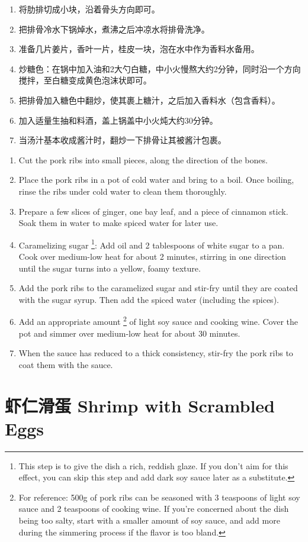 \documentclass{article}
\newcommand{\chn}[1]{\foreignlanguage{chinese-simplified}{#1}}
\begin{document}
\begin{paracol}{2}
    \begin{enumerate}
        \item \foreignlanguage{chinese-simplified}{将肋排切成小块，沿着骨头方向即可。}
        \item \chn{把排骨冷水下锅焯水，煮沸之后冲凉水将排骨洗净。}
        \item \chn{准备几片姜片，香叶一片，桂皮一块，泡在水中作为香料水备用。}
        \item \chn{炒糖色：在锅中加入油和2大勺白糖，中小火慢熬大约2分钟，同时沿一个方向搅拌，至白糖变成黄色泡沫状即可。}
        \item \chn{把排骨加入糖色中翻炒，使其裹上糖汁，之后加入香料水（包含香料）。}
        \item \chn{加入适量生抽和料酒，盖上锅盖中小火炖大约30分钟。}
        \item \chn{当汤汁基本收成酱汁时，翻炒一下排骨让其被酱汁包裹。}
    \end{enumerate}
    
    \switchcolumn
    \begin{enumerate}
        \item Cut the pork ribs into small pieces, along the direction of the bones.
        \item Place the pork ribs in a pot of cold water and bring to a boil. 
        Once boiling, rinse the ribs under cold water to clean them thoroughly.
        \item Prepare a few slices of ginger, one bay leaf, and a piece of cinnamon stick. 
        Soak them in water to make spiced water for later use.
        \item Caramelizing sugar \footnote{This step is to give the dish a rich, reddish glaze. If you don't aim for this effect, you can skip this step and add dark soy sauce later as a substitute.}: 
        Add oil and 2 tablespoons of white sugar to a pan. 
        Cook over medium-low heat for about 2 minutes, stirring in one direction until the sugar turns into a yellow, foamy texture.
        \item Add the pork ribs to the caramelized sugar and stir-fry until they are coated with the sugar syrup. 
        Then add the spiced water (including the spices).
        \item Add an appropriate amount
        \footnote{For reference: 500g of pork ribs can be seasoned with 3 teaspoons of light soy sauce and 2 teaspoons of cooking wine. 
        If you're concerned about the dish being too salty, start with a smaller amount of soy sauce, and add more during the simmering process if the flavor is too bland.} 
        of light soy sauce and cooking wine. 
        Cover the pot and simmer over medium-low heat for about 30 minutes.
        \item When the sauce has reduced to a thick consistency, stir-fry the pork ribs to coat them with the sauce.
    \end{enumerate}
\end{paracol}
\section{\chn{虾仁滑蛋} Shrimp with Scrambled Eggs}
\end{document}
